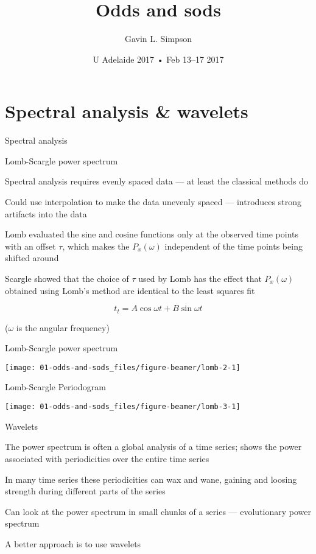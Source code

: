 \documentclass[11pt,ignorenonframetext,compress, aspectratio=169]{beamer}
\title{Odds and sods}
\author{Gavin L. Simpson}
\date{U Adelaide 2017 • Feb 13--17 2017}
\begin{document}
\frame{\titlepage}

\section{Spectral analysis \&
wavelets}\label{spectral-analysis-wavelets}

\begin{frame}{Spectral analysis}

\end{frame}

\begin{frame}{Lomb-Scargle power spectrum}

Spectral analysis requires evenly spaced data --- at least the classical
methods do

Could use interpolation to make the data unevenly spaced --- introduces
strong artifacts into the data

Lomb evaluated the sine and cosine functions only at the observed time
points with an offset \(\tau\), which makes the \(P_x(\omega)\)
independent of the time points being shifted around

Scargle showed that the choice of \(\tau\) used by Lomb has the effect
that \(P_x(\omega)\) obtained using Lomb's method are identical to the
least squares fit

\[t_t = A \cos \omega t + B \sin \omega t\]

(\(\omega\) is the angular frequency)

\end{frame}

\begin{frame}{Lomb-Scargle power spectrum}

\begin{center}\texttt{[image: 01-odds-and-sods\_files/figure-beamer/lomb-2-1]} \end{center}

\end{frame}

\begin{frame}{Lomb-Scargle Periodogram}

\begin{center}\texttt{[image: 01-odds-and-sods\_files/figure-beamer/lomb-3-1]} \end{center}

\end{frame}

\begin{frame}{Wavelets}

The power spectrum is often a global analysis of a time series; shows
the power associated with periodicities over the entire time series

In many time series these periodicities can wax and wane, gaining and
loosing strength during different parts of the series

Can look at the power spectrum in small chunks of a series ---
\alert{evolutionary power spectrum}

A better approach is to use \alert{wavelets}

\end{frame}
\end{document}
